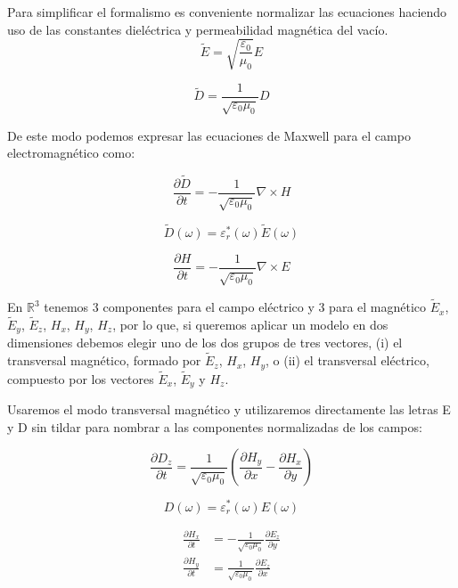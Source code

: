 \documentclass[11pt,a4paper,twoside,pdf]{article}
\numberwithin{equation}{section}
\begin{document}
Para simplificar el formalismo es conveniente normalizar las ecuaciones haciendo uso de las constantes dieléctrica y permeabilidad magnética del vacío.
\begin{equation}
\tilde{E}=\sqrt{\frac{\varepsilon_{0}}{\mu_{0}}}E
\end{equation}

\begin{equation}
\tilde{D}=\frac{1}{\sqrt{\varepsilon_{0}\mu_{0}}}D
\end{equation}

De este modo podemos expresar las ecuaciones de Maxwell para el campo electromagnético como:

\begin{equation}
\frac{\partial \tilde{D}}{\partial t}=-\frac{1}{\sqrt{\varepsilon_{0}\mu_{0}}}\nabla \times H
\end{equation}

\begin{equation}
\tilde{D}(\omega)=\varepsilon^*_{r}(\omega)\tilde{E}(\omega)
\end{equation}

\begin{equation}
\frac{\partial H}{\partial t}=-\frac{1}{\sqrt{\varepsilon_{0}\mu_{0}}}\nabla \times E
\end{equation}


En $\mathbb R^{3}$ tenemos 3 componentes para el campo eléctrico y 3 para el magnético $\tilde{E}_{x}$, $\tilde{E}_{y}$, $\tilde{E}_{z}$, $H_{x}$, $H_{y}$, $H_{z}$, por lo que, si queremos aplicar un modelo en dos dimensiones debemos elegir uno de los dos grupos de tres vectores, (i) el transversal magnético, formado por $\tilde{E}_{z}$, $H_{x}$, $H_{y}$, o (ii) el transversal eléctrico, compuesto por los vectores $\tilde{E}_{x}$, $\tilde{E}_{y}$ y $H_{z}$.

Usaremos el modo transversal magnético y utilizaremos directamente las letras E y D sin tildar para nombrar a las componentes normalizadas de los campos:

\begin{equation}
\frac{\partial D_{z}}{\partial t}=\frac{1}{\sqrt{\varepsilon_{0}\mu_{0}}}\left(\frac{\partial H_{y}}{\partial x}-\frac{\partial H_{x}}{\partial y}\right)
\end{equation}

\begin{equation}
{D}(\omega)=\varepsilon^*_{r}(\omega)E(\omega)
\end{equation}

\begin{align}
\frac{\partial H_{x}}{\partial t} &= -\frac{1}{\sqrt{\varepsilon_{0}\mu_{0}}}\frac{\partial E_{z}}{\partial y} \nonumber \\
\frac{\partial H_{y}}{\partial t} &=  \frac{1}{\sqrt{\varepsilon_{0}\mu_{0}}}\frac{\partial E_{z}}{\partial x}
\end{align}
\end{document}
